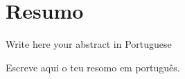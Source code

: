 \chapter*{Resumo}\label{resumo}

Write here your abstract in Portuguese

Escreve aqui o teu resomo em português.
